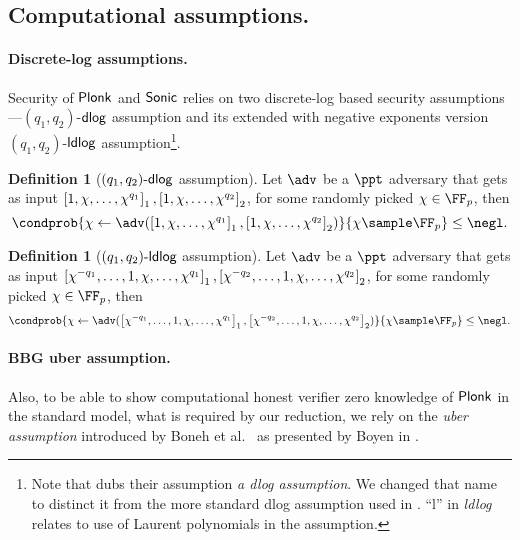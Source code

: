 \documentclass[runningheads,11pt]{llncs}
\theoremstyle{definition} \newtheorem{definition}[theorem]{Definition}
\begin{document}
\subsection{Computational assumptions.}

\paragraph{Discrete-log assumptions.}
Security of $\textnormal{\textsf{Plonk}}$ and ${\textnormal{\textsf{Sonic}}}$ relies on two discrete-log based security
assumptions---$(q_1, q_2)$-$\mathsf{dlog}$ assumption and its extended with negative
exponents version $(q_1, q_2)$-$\mathsf{ldlog}$ assumption\footnote{Note that
  \cite{CCS:MBKM19} dubs their assumption \emph{a dlog assumption}. We changed
  that name to distinct it from the more standard dlog assumption used in
  \cite{EPRINT:GabWilCio19}. ``l'' in \emph{ldlog} relates to use of Laurent
  polynomials in the assumption.}.

\begin{definition}[$(q_1, q_2)\text{-}\mathsf{dlog}$ assumption]
	Let $\adv$ be a $\ppt$ adversary that gets as input $\left[1, \chi, \ldots, \chi^{q_1}\right]_{1}, \left[1, \chi, \ldots, \chi^{q_2}\right]_{2}$, for some randomly picked $\chi \in \FF_p$, then
	\[
		\condprob{\chi \gets \adv(\gone{1, \chi, \ldots, \chi^{q_1}}, \gtwo{1, \chi, \ldots, \chi^{q_2} })}{\chi \sample \FF_p} \leq \negl.
	\]
\end{definition}

\begin{definition}[$(q_1, q_2)\text{-}\mathsf{ldlog}$ assumption]
		Let $\adv$ be a $\ppt$ adversary that gets as input $\left[\chi^{-q_1},
		\ldots, 1, \chi, \ldots, \chi^{q_1}\right]_{1}, \left[\chi^{-q_2}, \ldots, 1, \chi, \ldots, \chi^{q_2}\right]_{2}$, for some randomly picked $\chi \in \FF_p$, then
	\[
			\condprob{\chi \gets \adv(\gone{\chi^{-q_1}, \ldots, 1, \chi, \ldots,
			\chi^{q_1}}, \gtwo{\chi^{-q_2}, \ldots, 1, \chi, \ldots, \chi^{q_2} })}{\chi \sample \FF_p} \leq \negl.
	\]
\end{definition}

\paragraph{BBG uber assumption.}
Also, to be able to show computational honest verifier zero knowledge of
$\textnormal{\textsf{Plonk}}$ in the standard model, what is required by our reduction, we rely on the
\emph{uber assumption} introduced by Boneh et
al.~\cite{EC:BonBoyGoh05} as presented by Boyen in \cite{PAIRING:Boyen08}.
\end{document}
